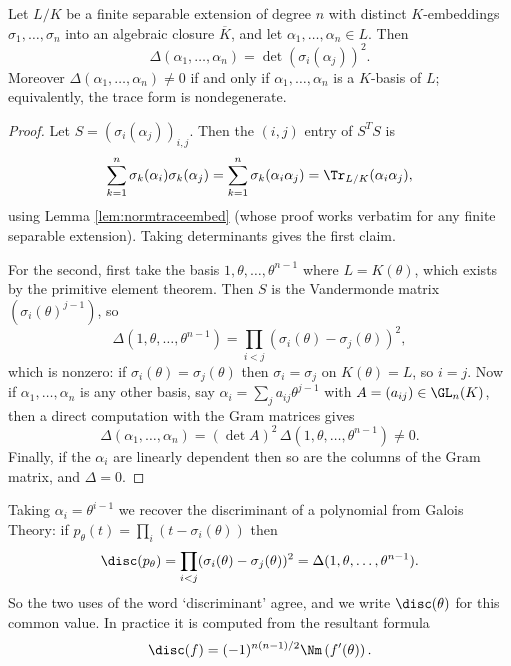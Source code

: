\begin{proposition}\label{prop:traceform}
	Let $L/K$ be a finite separable extension of degree $n$ with distinct $K$-embeddings $\sigma_1, \dots, \sigma_n$ into an algebraic closure $\overline K$, and let $\alpha_1, \dots, \alpha_n \in L$. Then
	$$\Delta(\alpha_1, \dots, \alpha_n) = \det\left(\sigma_i(\alpha_j)\right)^2.$$
	Moreover $\Delta(\alpha_1,\dots,\alpha_n) \neq 0$ if and only if $\alpha_1, \dots, \alpha_n$ is a $K$-basis of $L$; equivalently, the trace form is nondegenerate.
\end{proposition}

\begin{proof}
	Let $S = (\sigma_i(\alpha_j))_{i,j}$. Then the $(i,j)$ entry of $S^TS$ is
	$$\sum_{k=1}^n \sigma_k(\alpha_i)\sigma_k(\alpha_j) = \sum_{k=1}^n\sigma_k(\alpha_i\alpha_j) = \Tr_{L/K}(\alpha_i\alpha_j),$$
	using Lemma \ref{lem:normtraceembed} (whose proof works verbatim for any finite separable extension). Taking determinants gives the first claim.

	For the second, first take the basis $1, \theta, \dots, \theta^{n-1}$ where $L = K(\theta)$, which exists by the primitive element theorem. Then $S$ is the Vandermonde matrix $(\sigma_i(\theta)^{j-1})$, so
	$$\Delta(1,\theta,\dots,\theta^{n-1}) = \prod_{i < j}\left(\sigma_i(\theta) - \sigma_j(\theta)\right)^2,$$
	which is nonzero: if $\sigma_i(\theta) = \sigma_j(\theta)$ then $\sigma_i = \sigma_j$ on $K(\theta) = L$, so $i = j$. Now if $\alpha_1, \dots, \alpha_n$ is any other basis, say $\alpha_i = \sum_j a_{ij}\theta^{j-1}$ with $A = (a_{ij}) \in \GL_n(K)$, then a direct computation with the Gram matrices gives
	$$\Delta(\alpha_1,\dots,\alpha_n) = (\det A)^2\,\Delta(1,\theta,\dots,\theta^{n-1}) \neq 0.$$
	Finally, if the $\alpha_i$ are linearly dependent then so are the columns of the Gram matrix, and $\Delta = 0$.
\end{proof}

\begin{remark}
	Taking $\alpha_i = \theta^{i-1}$ we recover the discriminant of a polynomial from Galois Theory: if $p_\theta(t) = \prod_i(t - \sigma_i(\theta))$ then
	$$\disc(p_\theta) = \prod_{i<j}(\sigma_i(\theta) - \sigma_j(\theta))^2 = \Delta(1, \theta, \dots, \theta^{n-1}).$$
	So the two uses of the word `discriminant' agree, and we write $\disc(\theta)$ for this common value. In practice it is computed from the resultant formula
	$$\disc(f) = (-1)^{n(n-1)/2}\Nm\left(f'(\theta)\right).$$
\end{remark}

